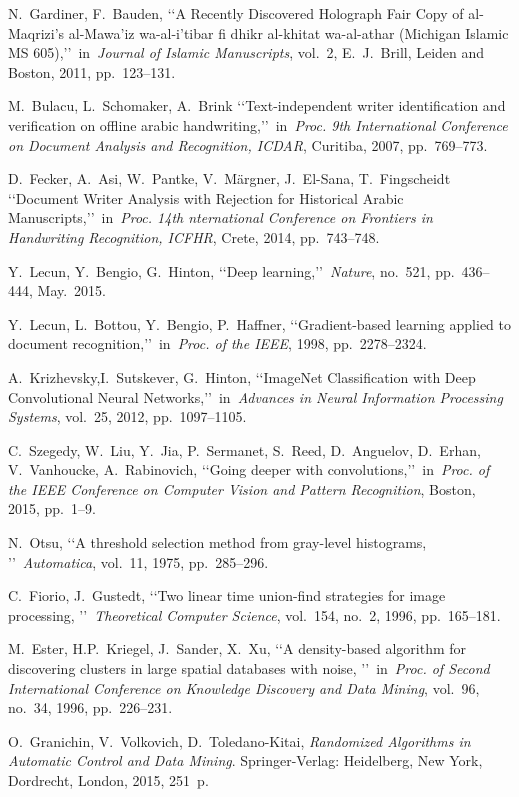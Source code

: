 \documentclass[conference,a4paper,twocolumn]{IEEEtran}
\begin{document}
\begin{thebibliography}{99}

 N.~Gardiner, F.~Bauden, \lq\lq A Recently Discovered Holograph Fair Copy of al-Maqrizi's al-Mawa'iz wa-al-i'tibar fi dhikr al-khitat wa-al-athar (Michigan Islamic MS 605),\rq\rq~in~\emph{Journal of Islamic Manuscripts}, vol.~2, E.~J.~Brill, Leiden and Boston, 2011, pp.~123--131.

 M.~Bulacu, L.~Schomaker, A.~Brink \lq\lq Text-independent writer identification and verification on offline arabic handwriting,\rq\rq~in~\emph{Proc. 9th International Conference on Document Analysis and Recognition, ICDAR}, Curitiba, 2007, pp.~769--773.

 D.~Fecker, A.~Asi, W.~Pantke, V.~Märgner, J.~El-Sana, T.~Fingscheidt \lq\lq Document Writer Analysis with Rejection for Historical Arabic Manuscripts,\rq\rq~in~\emph{Proc. 14th nternational Conference on Frontiers in Handwriting Recognition, ICFHR}, Crete, 2014, pp.~743--748.

 Y.~Lecun, Y.~Bengio, G.~Hinton, \lq\lq Deep learning,\rq\rq~\emph{Nature}, no.~521, pp.~436--444, May.~2015.

 Y.~Lecun, L.~Bottou, Y.~Bengio, P.~Haffner, \lq\lq Gradient-based learning applied to document recognition,\rq\rq~in~\emph{Proc. of the IEEE}, 1998, pp.~2278--2324.

 A.~Krizhevsky,I.~Sutskever, G.~Hinton, \lq\lq ImageNet Classification with Deep Convolutional Neural Networks,\rq\rq~in~\emph{Advances in Neural Information Processing Systems}, vol.~25, 2012, pp.~1097--1105.

 C.~Szegedy, W.~Liu, Y.~Jia, P.~Sermanet, S.~Reed, D.~Anguelov, D.~Erhan, V.~Vanhoucke, A.~Rabinovich, \lq\lq Going deeper with convolutions,\rq\rq~in~\emph{Proc. of the IEEE Conference on Computer Vision and Pattern Recognition}, Boston, 2015, pp.~1--9.

 N.~Otsu, \lq\lq A threshold selection method from gray-level histograms, \rq\rq~\emph{Automatica}, vol.~11, 1975, pp.~285--296.

 C.~Fiorio, J.~Gustedt, \lq\lq Two linear time union-find strategies for image processing, \rq\rq~\emph{Theoretical Computer Science}, vol.~154, no.~2, 1996, pp.~165--181.

 M.~Ester, H.P.~Kriegel, J.~Sander, X.~Xu, \lq\lq A density-based algorithm for discovering clusters in large spatial databases with noise, \rq\rq~in~\emph{Proc. of Second International
Conference on Knowledge Discovery and Data Mining}, vol.~96, no.~34, 1996, pp.~226--231.

 O.~Granichin, V.~Volkovich, D.~Toledano-Kitai, \emph{Randomized Algorithms in Automatic Control and Data Mining}. Springer-Verlag: Heidelberg, New York, Dordrecht, London, 2015, 251~p.

\end{thebibliography}


\end{document}
